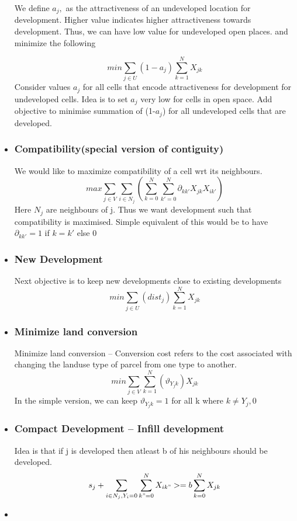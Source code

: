 \documentclass[twoside,10pt]{article}
\begin{document}
\begin{itemize}
We define $ a_{j},$ as the attractiveness of an undeveloped location for development. Higher value indicates higher attractiveness towards development.  Thus, we can have low value for undeveloped open places. and minimize the following

 $$
 min\sum_{j \in U} (1-a_j) \sum_{k=1}^N X_{jk}
 $$
Consider values $a_j$  for all cells that encode attractiveness for development for undeveloped cells. Idea is to set $a_j$ very low for cells in open space. Add objective to minimise summation of (1-$a_j$) for all undeveloped cells that are developed. 

\item 
\subsubsection*{ Compatibility(special version of contiguity)}
We would like to maximize compatibility of a cell wrt its neighbours.
 $$
max \sum_{j \in V}  \sum_{i \in N_j}(\sum_{k=0}^{N}\sum_{k'=0}^{N}\partial_{kk'} X_{jk} X_{ik'})
 $$
Here $N_j $ are neighbours of j. Thus we want development such that compatibility is maximised. Simple equivalent of this would be to have $\partial_{kk'} = 1 $ if  $k =k'$ else $0$
\item
\subsubsection*{ New Development}
Next objective is to keep new developments close to existing developments
 $$
 min\sum_{j \in U}(dist_j) \sum_{k=1}^N X_{jk}
 $$

\item

\subsubsection*{Minimize land conversion }
Minimize land conversion -- Conversion cost refers to the cost associated with changing the landuse type of parcel from one type to another.
$$
 min\sum_{j \in V}  \sum_{k=1}^N (\vartheta_{Y_{j}k}) X_{jk}
 $$
In the simple version, we can keep $\vartheta_{Y_{j}k} =  1$ for all k where $k \neq Y_{j},0$
\item
\subsubsection*{Compact Development -- Infill development}
Idea is that if j is developed then atleast b of his neighbours should be developed.
$$
s_j +\sum_{i \in N_j, Y_{i} =0 } \sum_{k"=0}^N X_{ik"} >= b \sum_{k=0}^N X_{jk}
 $$
\item

\end{itemize}
\end{document}
